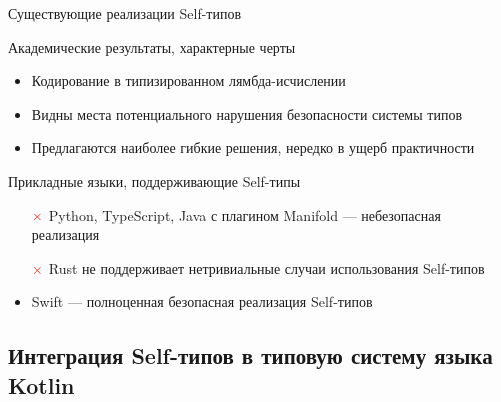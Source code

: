 \documentclass[usenames, dvipsnames]{beamer}
\begin{document}
\begin{frame}{Существующие реализации Self-типов}
        \begin{block}{Академические результаты, характерные черты}
            \begin{itemize}
                \item Кодирование в типизированном лямбда-исчислении
                \item Видны места потенциального нарушения безопасности системы типов
                \item Предлагаются наиболее гибкие решения, нередко в ущерб практичности
            \end{itemize}
        \end{block}

        \begin{block}{Прикладные языки, поддерживающие Self-типы}
            \begin{itemize}
                \item[$\color{red} \mathbf{\times}$] Python, TypeScript, Java с плагином Manifold --- небезопасная реализация
                \item[$\color{red} \mathbf{\times}$] Rust не поддерживает нетривиальные случаи использования Self-типов %
                \item Swift --- полноценная безопасная реализация Self-типов
            \end{itemize}
        \end{block}
    \end{frame}


    \subsection{Интеграция Self-типов в типовую систему языка Kotlin}
\end{document}
